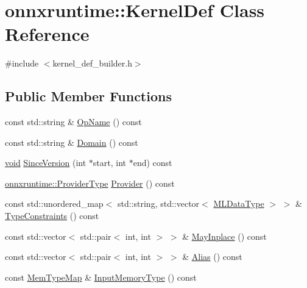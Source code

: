 \hypertarget{classonnxruntime_1_1KernelDef}{}\section{onnxruntime\+:\+:Kernel\+Def Class Reference}
\label{classonnxruntime_1_1KernelDef}


{\ttfamily \#include $<$kernel\+\_\+def\+\_\+builder.\+h$>$}

\subsection*{Public Member Functions}
\begin{DoxyCompactItemize}
\item 
const std\+::string \& \mbox{\hyperlink{classonnxruntime_1_1KernelDef_ae874d0d7c281f29444425cf090bd9f79}{Op\+Name}} () const
\item 
const std\+::string \& \mbox{\hyperlink{classonnxruntime_1_1KernelDef_ada26407246c0c73ad1e362b20fc4b12f}{Domain}} () const
\item 
\mbox{\hyperlink{mlasi_8h_a88f941d423cb2a819b70a1358982b1a6}{void}} \mbox{\hyperlink{classonnxruntime_1_1KernelDef_a68bb3fdfd24118843231e5d66e909d4a}{Since\+Version}} (int $\ast$start, int $\ast$end) const
\item 
\mbox{\hyperlink{namespaceonnxruntime_a863e2227cbf32aab76aad35fdadff4bb}{onnxruntime\+::\+Provider\+Type}} \mbox{\hyperlink{classonnxruntime_1_1KernelDef_ae7e7a00809efc699a2dbd1f5c02505c8}{Provider}} () const
\item 
const std\+::unordered\+\_\+map$<$ std\+::string, std\+::vector$<$ \mbox{\hyperlink{namespaceonnxruntime_ad77d0a6e838ec7da5dc35fed5ee66b49}{M\+L\+Data\+Type}} $>$ $>$ \& \mbox{\hyperlink{classonnxruntime_1_1KernelDef_a6639ce1c43c3d37e84eb9db07921b1e8}{Type\+Constraints}} () const
\item 
const std\+::vector$<$ std\+::pair$<$ int, int $>$ $>$ \& \mbox{\hyperlink{classonnxruntime_1_1KernelDef_ada61b5a989565708579fff57468f48fd}{May\+Inplace}} () const
\item 
const std\+::vector$<$ std\+::pair$<$ int, int $>$ $>$ \& \mbox{\hyperlink{classonnxruntime_1_1KernelDef_a69d708dea7e1c6f379a5d5b8a3cfba6b}{Alias}} () const
\item 
const \mbox{\hyperlink{namespaceonnxruntime_ad53d5ace215052258a4346ee68c2624e}{Mem\+Type\+Map}} \& \mbox{\hyperlink{classonnxruntime_1_1KernelDef_ab9fbbfbb44dac50a83eef2f5b85f7321}{Input\+Memory\+Type}} () const

\end{DoxyCompactItemize}
